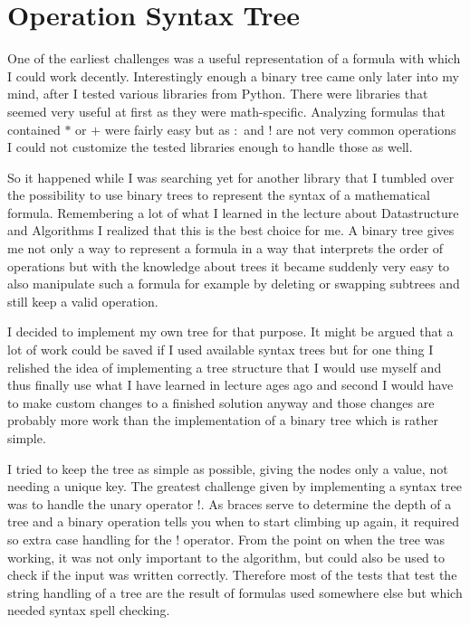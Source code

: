 
\section{Operation Syntax Tree}
One of the earliest challenges was a useful representation of a formula with which I could work decently. Interestingly enough a binary tree came only later into my mind, after I tested various libraries from Python. There were libraries that seemed very useful at first as they were math-specific. Analyzing formulas that contained $*$ or $+$ were fairly easy but as $:$ and $!$ are not very common operations I could not customize the tested libraries enough to handle those as well.

So it happened while I was searching yet for another library that I tumbled over the possibility to use binary trees to represent the syntax of a mathematical formula. Remembering a lot of what I learned in the lecture about Datastructure and Algorithms I realized that this is the best choice for me. A binary tree gives me not only a way to represent a formula in a way that interprets the order of operations but with the knowledge about trees it became suddenly very easy to also manipulate such a formula for example by deleting or swapping subtrees and still keep a valid operation. 

I decided to implement my own tree for that purpose. It might be argued that a lot of work could be saved if I used available syntax trees but for one thing I relished the idea of implementing a tree structure that I would use myself and thus finally use what I have learned in lecture ages ago and second I would have to make custom changes to a finished solution anyway and those changes are probably more work than the implementation of a binary tree which is rather simple.

I tried to keep the tree as simple as possible, giving the nodes only a value, not needing a unique key. The greatest challenge given by implementing a syntax tree was to handle the unary operator $!$. As braces serve to determine the depth of a tree and a binary operation tells you when to start climbing up again, it required so extra case handling for the $!$ operator. From the point on when the tree was working, it was not only important to the algorithm, but could also be used to check if the input was written correctly. Therefore most of the tests that test the string handling of a tree are the result of formulas used somewhere else but which needed syntax spell checking. 


